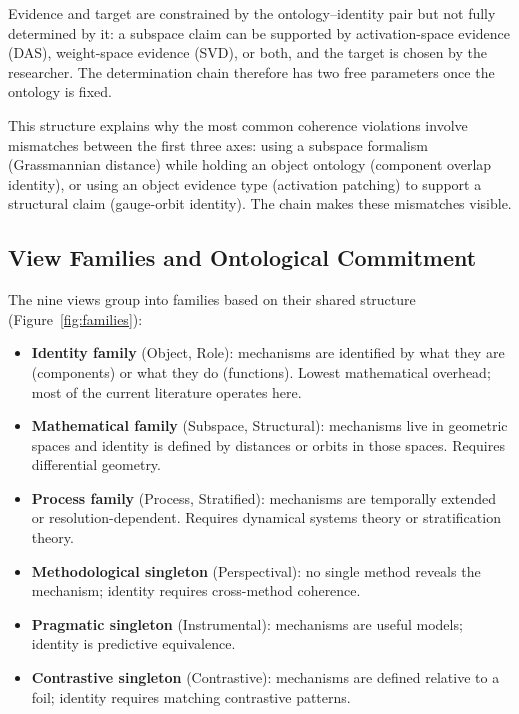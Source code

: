 \documentclass{article}
\begin{document}
Evidence and target are constrained by the ontology--identity pair but
not fully determined by it: a subspace claim can be supported by
activation-space evidence (DAS), weight-space evidence (SVD), or both,
and the target is chosen by the researcher.  The determination chain
therefore has two free parameters once the ontology is fixed.

This structure explains why the most common coherence violations involve
mismatches between the first three axes: using a subspace formalism
(Grassmannian distance) while holding an object ontology (component
overlap identity), or using an object evidence type (activation patching)
to support a structural claim (gauge-orbit identity).  The chain makes
these mismatches visible.

\subsection{View Families and Ontological Commitment}\label{sec:families}

The nine views group into families based on their shared structure
(Figure~\ref{fig:families}):

\begin{itemize}[leftmargin=*]
\item \textbf{Identity family} (Object, Role): mechanisms are identified
      by what they are (components) or what they do (functions).  Lowest
      mathematical overhead; most of the current literature operates here.
\item \textbf{Mathematical family} (Subspace, Structural): mechanisms
      live in geometric spaces and identity is defined by distances or
      orbits in those spaces.  Requires differential geometry.
\item \textbf{Process family} (Process, Stratified): mechanisms are
      temporally extended or resolution-dependent.  Requires dynamical
      systems theory or stratification theory.
\item \textbf{Methodological singleton} (Perspectival): no single
      method reveals the mechanism; identity requires cross-method
      coherence.
\item \textbf{Pragmatic singleton} (Instrumental): mechanisms are useful
      models; identity is predictive equivalence.
\item \textbf{Contrastive singleton} (Contrastive): mechanisms are
      defined relative to a foil; identity requires matching contrastive
      patterns.
\end{itemize}
\end{document}
